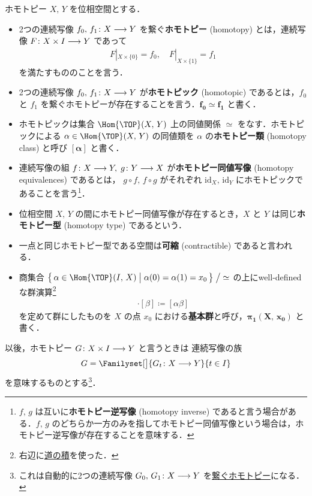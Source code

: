 \documentclass[algtopo_main]{subfiles}
\begin{document}
\begin{mydef}[label=def:homotopy-basic, breakable]{ホモトピー}
    $X,\, Y$ を位相空間とする．
    \begin{itemize}
        \item 2つの連続写像 $f_0,\, f_1 \colon X \longrightarrow Y$ を繋ぐ\textbf{ホモトピー} (homotopy) とは，連続写像 $F \colon X \times I \longrightarrow Y$ であって
        \begin{align}
            F|_{X \times \{0\}} = f_0,\quad F|_{X\times \{1\}} = f_1
        \end{align}
        を満たすもののことを言う．
        \item 2つの連続写像 $f_0,\, f_1 \colon X \longrightarrow Y$ が\textbf{ホモトピック} (homotopic) であるとは，$f_0$ と $f_1$ を繋ぐホモトピーが存在することを言う．$\bm{f_0 \simeq f_1}$ と書く．
        \item ホモトピックは集合 $\Hom{\TOP}(X,\, Y)$ 上の同値関係 $\simeq$ をなす．ホモトピックによる $\alpha \in \Hom{\TOP}(X,\, Y)$ の同値類を $\alpha$ の\textbf{ホモトピー類} (homotopy class) と呼び $\bm{[\alpha]}$ と書く．
        \item 連続写像の組 $f \colon X \longrightarrow Y,\; g \colon Y \longrightarrow X$ が\textbf{ホモトピー同値写像} (homotopy equivalences) であるとは，
        $g \circ f,\, f \circ g$ がそれぞれ $\mathrm{id}_X,\, \mathrm{id}_Y$ にホモトピックであることを言う\footnote{$f,\, g$ は互いに\textbf{ホモトピー逆写像} (homotopy inverse) であると言う場合がある．$f,\, g$ のどちらか一方のみを指してホモトピー同値写像という場合は，ホモトピー逆写像が存在することを意味する．}．
        \item 位相空間 $X,\, Y$ の間にホモトピー同値写像が存在するとき，$X$ と $Y$ は同じ\textbf{ホモトピー型} (homotopy type) であるという．
        \item 一点と同じホモトピー型である空間は\textbf{可縮} (contractible) であると言われる．
        \item 商集合 $\bigl\{\, \alpha \in \Hom{\TOP}(I,\, X) \bigm| \alpha(0) = \alpha(1) = x_0 \,\bigr\} \bigm/ {\simeq}$ の上にwell-definedな群演算\footnote{右辺に\hyperref[def:path-basic]{道の積}を使った．}
        \begin{align}
            [\alpha] \cdot [\beta] \coloneqq [\alpha\beta]
        \end{align}
        を定めて群にしたものを $X$ の点 $x_0$ における\textbf{基本群}と呼び，$\bm{\pi_1(X,\, x_0)}$ と書く．
    \end{itemize}
\end{mydef}
以後，ホモトピー $G \colon X \times I \longrightarrow Y$ と言うときは
連続写像の族
\begin{align}
    G = \Familyset[\big]{G_t \colon X \lto Y}{t \in I}
\end{align}
を意味するものとする\footnote{これは自動的に2つの連続写像 $G_0,\, G_1 \colon X \longrightarrow Y$ を\hyperref[def:homotopy-basic]{繋ぐホモトピー}になる．}．
\end{document}

